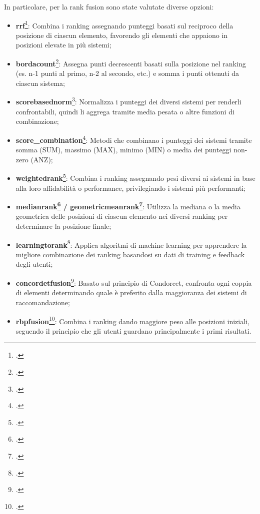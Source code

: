 In particolare, per la rank fusion sono state valutate diverse opzioni:
\begin{itemize}
    \item \textbf{\gls{rrf}}\footcite{article:reciprocal_rank_fusion}: Combina i ranking assegnando punteggi basati sul reciproco della posizione di ciascun elemento, favorendo gli elementi che appaiono in posizioni elevate in più sistemi;
    \item \textbf{\gls{bordacount}}\footcite{site:borda_count}: Assegna punti decrescenti basati sulla posizione nel ranking (es. n-1 punti al primo, n-2 al secondo, etc.) e somma i punti ottenuti da ciascun sistema;
    \item \textbf{\gls{scorebasednorm}}\footcite{site:score_normalization}: Normalizza i punteggi dei diversi sistemi per renderli confrontabili, quindi li aggrega tramite media pesata o altre funzioni di combinazione;
    \item \textbf{\gls{score_combination}}\footcite{article:score_combination}: Metodi che combinano i punteggi dei sistemi tramite somma (SUM), massimo (MAX), minimo (MIN) o media dei punteggi non-zero (ANZ);
    \item \textbf{\gls{weightedrank}}\footcite{article:weighted_rank_aggregation}: Combina i ranking assegnando pesi diversi ai sistemi in base alla loro affidabilità o performance, privilegiando i sistemi più performanti;
    \item \textbf{\gls{medianrank}\footcite{site:median} / \gls{geometricmeanrank}\footcite{site:geometric_mean}}: Utilizza la mediana o la media geometrica delle posizioni di ciascun elemento nei diversi ranking per determinare la posizione finale;
    \item \textbf{\gls{learningtorank}}\footcite{site:learning_to_rank}: Applica algoritmi di machine learning per apprendere la migliore combinazione dei ranking basandosi su dati di training e feedback degli utenti;
    \item \textbf{\gls{concordetfusion}}\footcite{site:condorcet_method}: Basato sul principio di Condorcet, confronta ogni coppia di elementi determinando quale è preferito dalla maggioranza dei sistemi di raccomandazione;
    \item \textbf{\gls{rbpfusion}}\footcite{article:rank_biased_precision}: Combina i ranking dando maggiore peso alle posizioni iniziali, seguendo il principio che gli utenti guardano principalmente i primi risultati.
\end{itemize}

